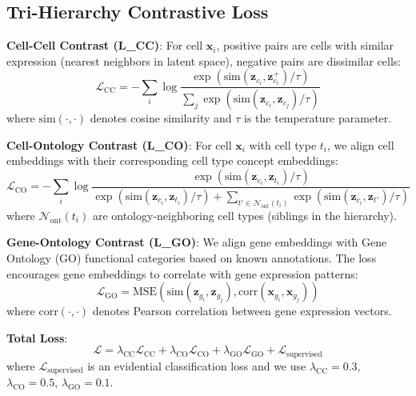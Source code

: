 \documentclass[11pt]{article}
\begin{document}
\subsection{Tri-Hierarchy Contrastive Loss}

\textbf{Cell-Cell Contrast (L\_CC)}: For cell $\mathbf{x}_i$, positive pairs are cells with similar expression (nearest neighbors in latent space), negative pairs are dissimilar cells:
\begin{equation}
\mathcal{L}_{\text{CC}} = -\sum_{i} \log \frac{\exp(\text{sim}(\mathbf{z}_{c_i}, \mathbf{z}_{c_i}^+) / \tau)}{\sum_{j} \exp(\text{sim}(\mathbf{z}_{c_i}, \mathbf{z}_{c_j}) / \tau)}
\end{equation}
where $\text{sim}(\cdot, \cdot)$ denotes cosine similarity and $\tau$ is the temperature parameter.

\textbf{Cell-Ontology Contrast (L\_CO)}: For cell $\mathbf{x}_i$ with cell type $t_i$, we align cell embeddings with their corresponding cell type concept embeddings:
\begin{equation}
\mathcal{L}_{\text{CO}} = -\sum_{i} \log \frac{\exp(\text{sim}(\mathbf{z}_{c_i}, \mathbf{z}_{t_i}) / \tau)}{\exp(\text{sim}(\mathbf{z}_{c_i}, \mathbf{z}_{t_i}) / \tau) + \sum_{t' \in \mathcal{N}_{\text{ont}}(t_i)} \exp(\text{sim}(\mathbf{z}_{c_i}, \mathbf{z}_{t'}) / \tau)}
\end{equation}
where $\mathcal{N}_{\text{ont}}(t_i)$ are ontology-neighboring cell types (siblings in the hierarchy).

\textbf{Gene-Ontology Contrast (L\_GO)}: We align gene embeddings with Gene Ontology (GO) functional categories based on known annotations. The loss encourages gene embeddings to correlate with gene expression patterns:
\begin{equation}
\mathcal{L}_{\text{GO}} = \text{MSE}(\text{sim}(\mathbf{z}_{g_i}, \mathbf{z}_{g_j}), \text{corr}(\mathbf{x}_{g_i}, \mathbf{x}_{g_j}))
\end{equation}
where $\text{corr}(\cdot, \cdot)$ denotes Pearson correlation between gene expression vectors.

\textbf{Total Loss}:
\begin{equation}
\mathcal{L} = \lambda_{\text{CC}} \mathcal{L}_{\text{CC}} + \lambda_{\text{CO}} \mathcal{L}_{\text{CO}} + \lambda_{\text{GO}} \mathcal{L}_{\text{GO}} + \mathcal{L}_{\text{supervised}}
\end{equation}
where $\mathcal{L}_{\text{supervised}}$ is an evidential classification loss and we use $\lambda_{\text{CC}}=0.3$, $\lambda_{\text{CO}}=0.5$, $\lambda_{\text{GO}}=0.1$.
\end{document}
